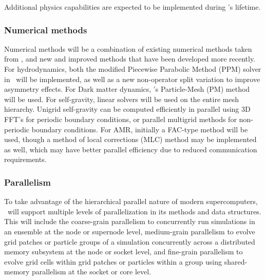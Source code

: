 \documentclass[11pt]{article}
\begin{document}
    Additional physics capabilities are expected to be implemented
    during \cello's lifetime.

    \subsubsection{Numerical methods}

    Numerical methods will be a combination of existing numerical
    methods taken from \enzo, and new and improved methods that have
    been developed more recently.  For hydrodynamics, both the
    modified Piecewise Parabolic Method (PPM) solver in \enzo\ will be
    implemented, as well as a new non-operator split variation to
    improve asymmetry effects.  For Dark matter dynamics, \enzo's
    Particle-Mesh (PM) method will be used.  For self-gravity, linear
    solvers will be used on the entire mesh hierarchy.  Unigrid
    self-gravity can be computed efficiently in parallel using 3D
    FFT's for periodic boundary conditions, or parallel multigrid
    methods for non-periodic boundary conditions.  For AMR, initially
    a FAC-type method will be used, though a method of local
    corrections (MLC) method may be implemented as well, which may
    have better parallel efficiency due to reduced communication
    requirements.

    \subsubsection{Parallelism} 


    To take advantage of the hierarchical parallel nature of modern
    supercomputers, \cello\ will support multiple levels of
    parallelization in its methods and data structures.  This will
    include the coarse-grain parallelism to concurrently run
    simulations in an ensemble at the node or supernode level,
    medium-grain parallelism to evolve grid patches or particle groups
    of a simulation concurrently across a distributed memory subsystem
    at the node or socket level, and fine-grain parallelism to evolve
    grid cells within grid patches or particles within a group using
    shared-memory parallelism at the socket or core level.

\end{document}
